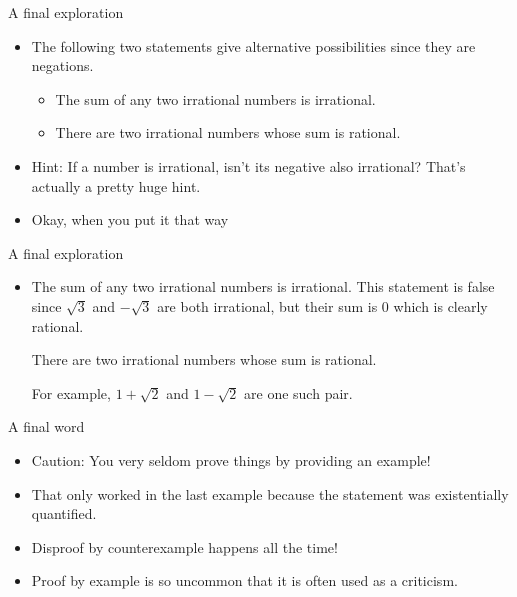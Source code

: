 \documentclass[handout,landscape]{beamer}
\begin{document}
\begin{frame}{A final exploration}
\begin{itemize}
\item The following two statements give alternative possibilities since they are negations. \pause
\begin{itemize}
\item The sum of any two irrational numbers is irrational. \pause
\item There are two irrational numbers whose sum is rational. \pause
\end{itemize}
\item Hint: If a number is irrational, isn't its negative also irrational?  \pause That's actually a pretty huge hint.\pause
\item Okay, when you put it that way\textellipsis

\end{itemize}
\end{frame}


\begin{frame}{A final exploration}
\begin{itemize}

\item The sum of any two irrational numbers is irrational. \pause \newline
This statement is false since $\sqrt{3}$ and $-\sqrt{3}$ are both irrational, but their sum is $0$ which is clearly rational. \pause

\begin{thm*}
There are two irrational numbers whose sum is rational. 
\end{thm*}
\pause 
For example, $1+\sqrt{2}$ and $1-\sqrt{2}$ are one such pair. 
\end{itemize}
\end{frame}


\begin{frame}{A final word}
\begin{itemize}

\item Caution:  You very seldom prove things by providing an example! \pause 
\item That only worked in the last example because the statement was existentially quantified. \pause
\item Disproof by counterexample happens all the time! \pause 
\item Proof by example is so uncommon that it is often used as a criticism.

\end{itemize}
\end{frame}
\end{document}
